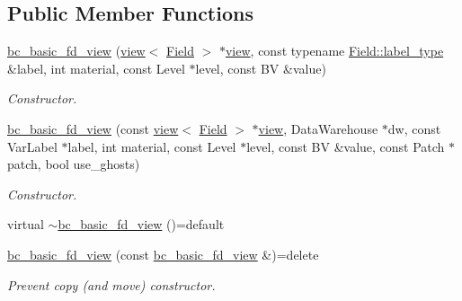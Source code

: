 \subsection*{Public Member Functions}
\begin{DoxyCompactItemize}
\item 
\hyperlink{classUintah_1_1PhaseField_1_1detail_1_1bc__basic__fd__view_3_01ScalarField_3_01T_01_4_00_01STN_00_01VAR_00_01P_01_4_a71f5d2796724efaaf5e046f86e780aea}{bc\+\_\+basic\+\_\+fd\+\_\+view} (\hyperlink{classUintah_1_1PhaseField_1_1detail_1_1view}{view}$<$ \hyperlink{structUintah_1_1PhaseField_1_1ScalarField}{Field} $>$ $\ast$\hyperlink{classUintah_1_1PhaseField_1_1detail_1_1view}{view}, const typename \hyperlink{structUintah_1_1PhaseField_1_1ScalarField_a7a77875e030da64c47ce9f6c22a06959}{Field\+::label\+\_\+type} \&label, int material, const Level $\ast$level, const BV \&value)
\begin{DoxyCompactList}\small\item\em Constructor. \end{DoxyCompactList}\item 
\hyperlink{classUintah_1_1PhaseField_1_1detail_1_1bc__basic__fd__view_3_01ScalarField_3_01T_01_4_00_01STN_00_01VAR_00_01P_01_4_a302171385c2d6e02780239bf81b4231a}{bc\+\_\+basic\+\_\+fd\+\_\+view} (const \hyperlink{classUintah_1_1PhaseField_1_1detail_1_1view}{view}$<$ \hyperlink{structUintah_1_1PhaseField_1_1ScalarField}{Field} $>$ $\ast$\hyperlink{classUintah_1_1PhaseField_1_1detail_1_1view}{view}, Data\+Warehouse $\ast$dw, const Var\+Label $\ast$label, int material, const Level $\ast$level, const BV \&value, const Patch $\ast$patch, bool use\+\_\+ghosts)
\begin{DoxyCompactList}\small\item\em Constructor. \end{DoxyCompactList}\item 
virtual \hyperlink{classUintah_1_1PhaseField_1_1detail_1_1bc__basic__fd__view_3_01ScalarField_3_01T_01_4_00_01STN_00_01VAR_00_01P_01_4_a8440a2cb32190e75b3f9f79a408980c8}{$\sim$bc\+\_\+basic\+\_\+fd\+\_\+view} ()=default
\item 
\hyperlink{classUintah_1_1PhaseField_1_1detail_1_1bc__basic__fd__view_3_01ScalarField_3_01T_01_4_00_01STN_00_01VAR_00_01P_01_4_a48c8acbfa62da6002160c50117b7b75d}{bc\+\_\+basic\+\_\+fd\+\_\+view} (const \hyperlink{classUintah_1_1PhaseField_1_1detail_1_1bc__basic__fd__view}{bc\+\_\+basic\+\_\+fd\+\_\+view} \&)=delete
\begin{DoxyCompactList}\small\item\em Prevent copy (and move) constructor. \end{DoxyCompactList}\item 

\end{DoxyCompactItemize}
